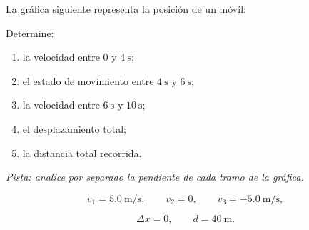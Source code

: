 \begin{ejercicio}
La gráfica siguiente representa la posición de un móvil:

\begin{center}
\end{center}

Determine:

\begin{enumerate}[label=\alph*)]
    \item la velocidad entre \(0\) y \(\SI{4}{\second}\);
    \item el estado de movimiento entre \(\SI{4}{\second}\) y \(\SI{6}{\second}\);
    \item la velocidad entre \(\SI{6}{\second}\) y \(\SI{10}{\second}\);
    \item el desplazamiento total;
    \item la distancia total recorrida.
\end{enumerate}

\textit{Pista: analice por separado la pendiente de cada tramo de la gráfica.}
\end{ejercicio}

\begin{respuesta}
\[
v_1=\SI{5.0}{\meter\per\second},
\qquad
v_2=0,
\qquad
v_3=-\SI{5.0}{\meter\per\second},
\]

\[
\Delta x=0,
\qquad
d=\SI{40}{\meter}.
\]
\end{respuesta}

